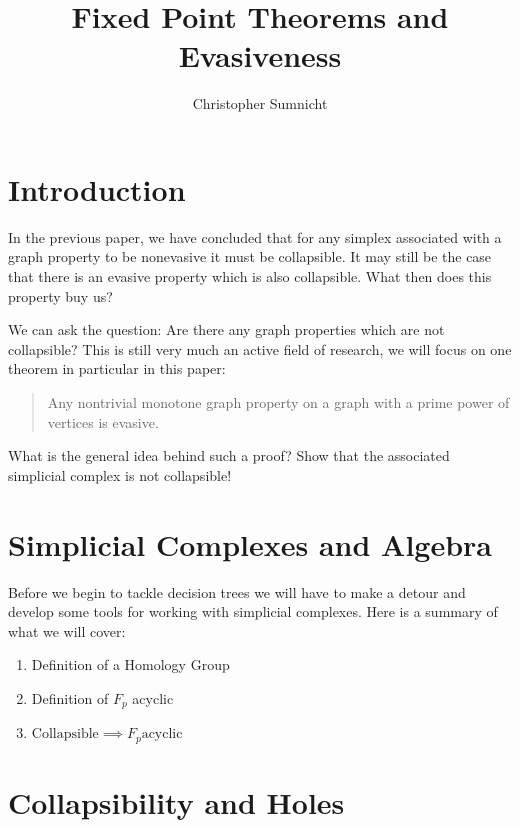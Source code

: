 \documentclass[letterpaper,12pt]{article}
\begin{document}
\title{Fixed Point Theorems and Evasiveness}
\author{Christopher Sumnicht}
\maketitle

\section{Introduction}

In the previous paper, we have concluded that for any simplex associated with a graph property to be nonevasive it must be collapsible. It may still be the case that there is an evasive property which is also collapsible. What then does this property buy us?

We can ask the question: Are there any graph properties which are not collapsible? This is still very much an active field of research, we will focus on one theorem in particular in this paper:

\begin{quote}
    Any nontrivial monotone graph property on a graph with a prime power of vertices is evasive.
\end{quote}

What is the general idea behind such a proof? Show that the associated simplicial complex is not collapsible!

\section{Simplicial Complexes and Algebra}

Before we begin to tackle decision trees we will have to make a detour and develop some tools for working with simplicial complexes. Here is a summary of what we will cover:

\begin{enumerate}
    \item{
            Definition of a Homology Group
        }
    \item{
            Definition of $F_p$ acyclic
        }
    \item{
            $\text{Collapsible} \implies F_p  \text{acyclic}$
        }
\end{enumerate}

\section{Collapsibility and Holes}
\end{document}
